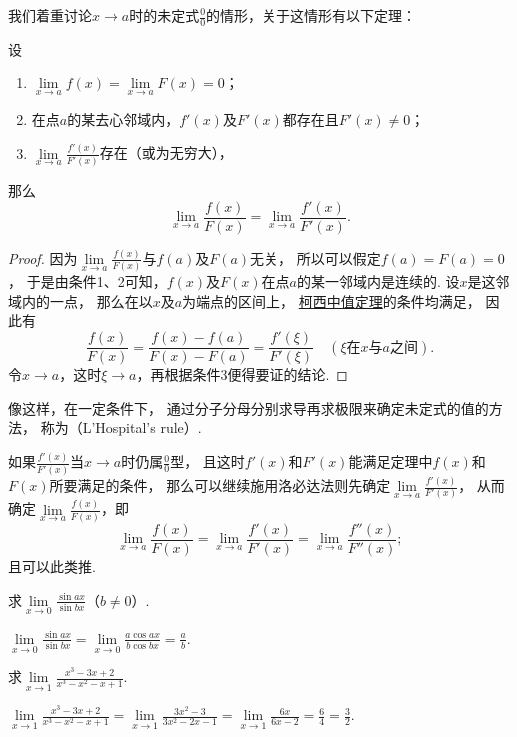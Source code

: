 我们着重讨论\(x \to a\)时的未定式\(\frac{0}{0}\)的情形，关于这情形有以下定理：
\begin{theorem}\label{theorem:微分中值定理.洛必达法则1}
设\begin{enumerate}
	\item \(\lim\limits_{x\to a} f(x) = \lim\limits_{x\to a} F(x) = 0\)；
	\item 在点\(a\)的某去心邻域内，\(f'(x)\)及\(F'(x)\)都存在且\(F'(x) \neq 0\)；
	\item \(\lim\limits_{x \to a} \frac{f'(x)}{F'(x)}\)存在（或为无穷大），
\end{enumerate}
那么\[
	\lim\limits_{x \to a} \frac{f(x)}{F(x)}
	= \lim\limits_{x \to a} \frac{f'(x)}{F'(x)}.
\]
\begin{proof}
因为\(\lim\limits_{x\to a} \frac{f(x)}{F(x)}\)与\(f(a)\)及\(F(a)\)无关，
所以可以假定\(f(a)=F(a)=0\)，
于是由条件1、2可知，\(f(x)\)及\(F(x)\)在点\(a\)的某一邻域内是连续的.
设\(x\)是这邻域内的一点，
那么在以\(x\)及\(a\)为端点的区间上，
\hyperref[theorem:微分中值定理.柯西中值定理]{柯西中值定理}的条件均满足，
因此有\[
	\frac{f(x)}{F(x)}
	= \frac{f(x)-f(a)}{F(x)-F(a)}
	= \frac{f'(\xi)}{F'(\xi)}
	\quad(\text{\(\xi\)在\(x\)与\(a\)之间}).
\]
令\(x \to a\)，这时\(\xi \to a\)，再根据条件3便得要证的结论.
\end{proof}
\end{theorem}
像这样，在一定条件下，
通过分子分母分别求导再求极限来确定未定式的值的方法，
称为（L'Hospital's rule）.

如果\(\frac{f'(x)}{F'(x)}\)当\(x \to a\)时仍属\(\frac{0}{0}\)型，
且这时\(f'(x)\)和\(F'(x)\)能满足定理中\(f(x)\)和\(F(x)\)所要满足的条件，
那么可以继续施用洛必达法则先确定\(\lim\limits_{x \to a} \frac{f'(x)}{F'(x)}\)，
从而确定\(\lim\limits_{x \to a} \frac{f(x)}{F(x)}\)，即\[
	\lim\limits_{x \to a} \frac{f(x)}{F(x)}
	= \lim\limits_{x \to a} \frac{f'(x)}{F'(x)}
	= \lim\limits_{x \to a} \frac{f''(x)}{F''(x)};
\]
且可以此类推.

\begin{example}
\def\l{\lim\limits_{x\to0}}
\def\a{\l\frac{\sin ax}{\sin bx}}
求\(\a\)（\(b \neq 0\)）.
\begin{solution}
\(\a = \l\frac{a \cos ax}{b \cos bx} = \frac{a}{b}\).
\end{solution}
\end{example}

\begin{example}
\def\l{\lim\limits_{x\to1}}
\def\a{\l\frac{x^3-3x+2}{x^3-x^2-x+1}}
求\(\a\).
\begin{solution}
\(\a = \l\frac{3x^2-3}{3x^2-2x-1} = \l\frac{6x}{6x-2} = \frac{6}{4} = \frac{3}{2}\).
\end{solution}
\end{example}

